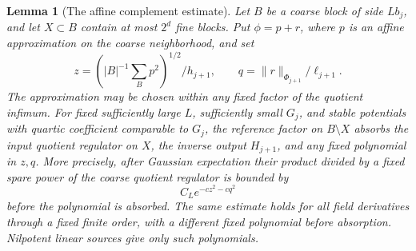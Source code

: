\documentclass[11pt]{article}
\newtheorem{lemma}[proposition]{Lemma}
\begin{document}
\begin{lemma}[The affine complement estimate]
\label{completion:reg-comparison}
Let \(B\) be a coarse block of side \(Lb_j\), and let \(X\subset B\)
contain at most \(2^d\) fine blocks. Put \(\phi=p+r\), where \(p\)
is an affine approximation on the coarse neighborhood, and set
\[
 z=\left(|B|^{-1}\sum_Bp^2\right)^{1/2}/h_{j+1},\qquad
 q=\|r\|_{\Phi_{j+1}}/\ell_{j+1}.
\]
The approximation may be chosen within any fixed factor of the
quotient infimum. For fixed sufficiently large \(L\), sufficiently
small \(G_j\), and stable potentials with quartic coefficient
comparable to \(G_j\), the reference factor on \(B\setminus X\)
absorbs the input quotient regulator on \(X\), the inverse output
\(H_{j+1}\), and any fixed polynomial in \(z,q\). More precisely,
after Gaussian expectation their product divided by a fixed spare
power of the coarse quotient regulator is bounded by
\[
 C_L e^{-c z^2-cq^2}
\]
before the polynomial is absorbed. The same estimate holds for all
field derivatives through a fixed finite order, with a different fixed
polynomial before absorption. Nilpotent linear sources give only such
polynomials.
\end{lemma}
\end{document}

